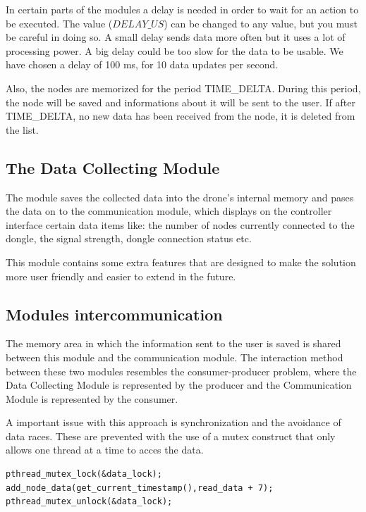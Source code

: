 In certain parts of the modules a delay is needed in order to wait for an action to be executed. The value ($DELAY\_US$) can be changed to any value, but you must be careful in doing so. A small delay sends data more often but it uses a lot of processing power. A big delay could be too slow for the data to be usable. We have chosen a delay of 100 ms, for 10 data updates per second.

Also, the nodes are memorized for the period TIME\_DELTA. During this period, the node will be saved and informations about it will be sent to the user. If after TIME\_DELTA, no new data has been received from the node, it is deleted from the list.

\subsection{The Data Collecting Module}

The module saves the collected data into the drone's internal memory and pases the data on to the communication module, which displays on the controller interface certain data items like: the number of nodes currently connected to the dongle, the signal strength, dongle connection status etc.

This module contains some extra features that are designed to make the solution more user friendly and easier to extend in the future.

\subsection{Modules intercommunication}

The memory area in which the information sent to the user is saved is shared between this module and the communication module. The interaction method between these two modules resembles the consumer-producer problem, where the Data Collecting Module is represented by the producer and the Communication Module is represented by the consumer.

A important issue with this approach is synchronization and the avoidance of data races. These are prevented with the use of a mutex construct that only allows one thread at a time to acces the data.

\lstset{numbers=none, mathescape=true, nolol=false,caption=Data Collection use of mutex,label=lst:task}
\begin{lstlisting}
pthread_mutex_lock(&data_lock);
add_node_data(get_current_timestamp(),read_data + 7);
pthread_mutex_unlock(&data_lock);
\end{lstlisting}


